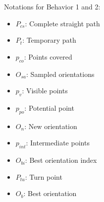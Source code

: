Notations for Behavior 1 and 2:
\begin{multicols}{2}
    \begin{itemize}[noitemsep,topsep=0pt]
        \item $P_{cs}$: Complete straight path
        \item $P_{t}$: Temporary path
        \item $p_{co}$: Points covered
        \item $O_{sa}$: Sampled orientations
        \item $p_v$: Visible points
        \item $p_{po}$: Potential point
        \item $O_n$: New orientation
        \item $p_{int}$: Intermediate points
        \item $O_{bi}$: Best orientation index
        \item $P_{tu}$: Turn point
        \item $O_b$: Best orientation
    \end{itemize}
\end{multicols}

